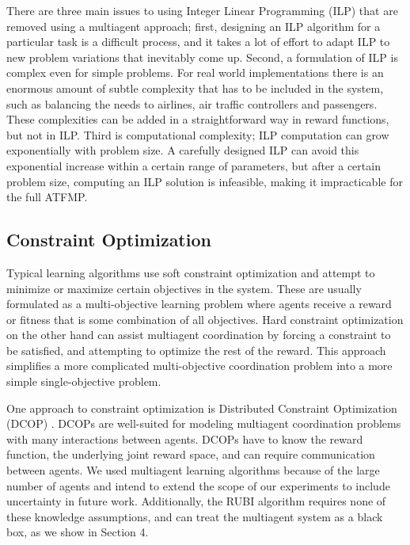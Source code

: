 \documentclass[onehalf,11pt]{beavtex}
\begin{document}
There are three main issues to using Integer Linear Programming (ILP) that are removed using a multiagent approach; first, designing an ILP algorithm for a particular task is a difficult process, and it takes a lot of effort to adapt ILP to new problem variations that inevitably come up. Second, a formulation of ILP is complex even for simple problems. For real world implementations there is an enormous amount of subtle complexity that has to be included in the system, such as balancing the needs to airlines, air traffic controllers and passengers. These complexities can be added in a straightforward way in reward functions, but not in ILP. Third is computational complexity; ILP computation can grow exponentially with problem size. A carefully designed ILP can avoid this exponential increase within a certain range of parameters, but after a certain problem size, computing an ILP solution is infeasible, making it impracticable for the full ATFMP.

\subsection{Constraint Optimization}

Typical learning algorithms use soft constraint optimization and attempt to minimize or maximize certain objectives in the system. These are usually formulated as a multi-objective learning problem where agents receive a reward or fitness that is some combination of all objectives. Hard constraint optimization on the other hand can assist multiagent coordination by forcing a constraint to be satisfied, and attempting to optimize the rest of the reward. This approach simplifies a more complicated multi-objective coordination problem into a more simple single-objective problem. 

One approach to constraint optimization is Distributed Constraint Optimization (DCOP) \cite{Junges:2008:EPD:1402298.1402308, Modi:2005:AAD:1120120.1120127}. DCOPs are well-suited for modeling multiagent coordination problems with many interactions between agents. DCOPs have to know the reward function, the underlying joint reward space, and can require communication between agents. We used multiagent learning algorithms because of the large number of agents and intend to extend the scope of our experiments to include uncertainty in future work. Additionally, the RUBI algorithm requires none of these knowledge assumptions, and can treat the multiagent system as a black box, as we show in Section 4.
\end{document}
